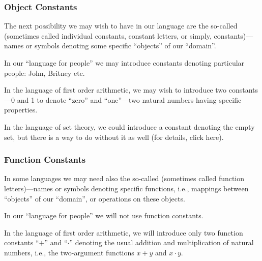 \subsubsection*{Object Constants}

The next possibility we may wish to have in our language are the so-called  (sometimes called individual constants, constant letters, or simply, constants)---names or symbols denoting some specific ``objects'' of our ``domain''.

\begin{ex}[]
In our ``language for people'' we may introduce constants denoting particular people: John, Britney etc.
\end{ex}

\begin{ex}[]
In the language of first order arithmetic, we may wish to introduce two constants---0 and 1 to denote ``zero'' and ``one''---two natural numbers having specific properties.
\end{ex}

\begin{ex}[]
In the language of set theory, we could introduce a constant denoting the empty set, but there is a way to do without it as well (for details, click here).
\end{ex}

\subsubsection*{Function Constants}

In some languages we may need also the so-called  (sometimes called function letters)---names or symbols denoting specific functions, i.e., mappings between ``objects'' of our ``domain'', or operations on these objects.

\begin{ex}[]
In our ``language for people'' we will not use function constants.
\end{ex}

\begin{ex}[]
In the language of first order arithmetic, we will introduce only two function constants ``\(+\)'' and ``\(\cdot\)'' denoting the usual addition and multiplication of natural numbers, i.e., the two-argument functions \(x+y\) and \(x\cdot y\).
\end{ex}

